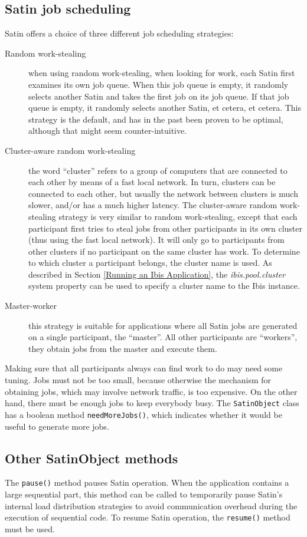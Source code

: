 \documentclass[10pt]{article}
\newcommand{\mysubsection}[1]{\subsection{#1}\label{#1}}
\begin{document}
\mysubsection{Satin job scheduling}

Satin offers a choice of three different job scheduling strategies:
\begin{description}
\item[Random work-stealing]
when using random work-stealing, when looking for work, each Satin
first examines its own job queue. When this job queue is empty,
it randomly selects another Satin and takes the first job on its job queue.
If that job queue is empty, it randomly selects another Satin, et cetera,
et cetera.  This strategy is the default, and has in the past been proven
to be optimal, although that might seem counter-intuitive.

\item[Cluster-aware random work-stealing]
the word ``cluster'' refers to a group of computers that are connected
to each other by means of a fast local network.
In turn, clusters can be connected to each other, but usually the
network between clusters is much slower, and/or has a much higher latency.
The cluster-aware random work-stealing strategy
is very similar to random work-stealing, except that
each participant first tries to steal jobs from other participants in its
own cluster (thus using the fast local network).
It will only go to participants from other clusters if no participant on the
same cluster has work.
To determine to which cluster a participant belongs, the cluster name
is used.
As described in Section \ref{Running an Ibis Application},
the \emph{ibis.pool.cluster} system property can be used to
specify a cluster name to the Ibis instance.

\item[Master-worker]
this strategy is suitable for applications where all Satin jobs are
generated on a single participant, the ``master''. All other participants
are ``workers'', they obtain jobs from the master and execute them.
\end{description}

Making sure that all participants always can find work to do may need
some tuning. Jobs must not be too small, because otherwise the mechanism
for obtaining jobs, which may involve network traffic, is too expensive.
On the other hand, there must be enough jobs to keep everybody busy.
The \texttt{SatinObject} class has a boolean method \texttt{needMoreJobs()},
which indicates whether it would be useful to generate more jobs.

\mysubsection{Other SatinObject methods}

The \texttt{pause()} method pauses Satin operation. When the application
contains a large sequential part, this method can be called to temporarily
pause Satin's internal load distribution strategies to avoid communication
overhead during the execution of sequential code.
To resume Satin operation, the \texttt{resume()} method must be used.
\end{document}

